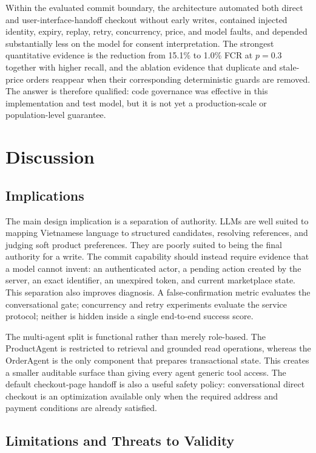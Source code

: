 \documentclass{IEEEtran}
\begin{document}
Within the evaluated commit boundary, the architecture automated both direct and user-interface-handoff checkout without early writes, contained injected identity, expiry, replay, retry, concurrency, price, and model faults, and depended substantially less on the model for consent interpretation. The strongest quantitative evidence is the reduction from 15.1\% to 1.0\% FCR at $p=0.3$ together with higher recall, and the ablation evidence that duplicate and stale-price orders reappear when their corresponding deterministic guards are removed. The answer is therefore qualified: code governance was effective in this implementation and test model, but it is not yet a production-scale or population-level guarantee.

\section{Discussion}

\subsection{Implications}

The main design implication is a separation of authority. LLMs are well suited to mapping Vietnamese language to structured candidates, resolving references, and judging soft product preferences. They are poorly suited to being the final authority for a write. The commit capability should instead require evidence that a model cannot invent: an authenticated actor, a pending action created by the server, an exact identifier, an unexpired token, and current marketplace state. This separation also improves diagnosis. A false-confirmation metric evaluates the conversational gate; concurrency and retry experiments evaluate the service protocol; neither is hidden inside a single end-to-end success score.

The multi-agent split is functional rather than merely role-based. The ProductAgent is restricted to retrieval and grounded read operations, whereas the OrderAgent is the only component that prepares transactional state. This creates a smaller auditable surface than giving every agent generic tool access. The default checkout-page handoff is also a useful safety policy: conversational direct checkout is an optimization available only when the required address and payment conditions are already satisfied.

\subsection{Limitations and Threats to Validity}
\end{document}
